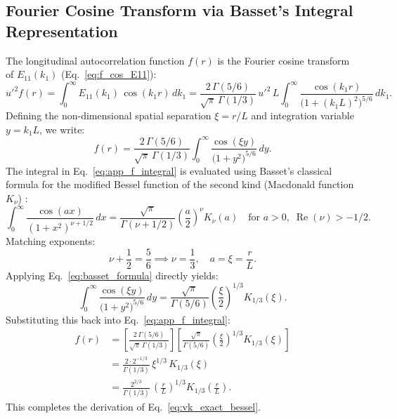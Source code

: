 \documentclass[lineno]{jfm}
\begin{document}
\subsection{Fourier Cosine Transform via Basset's Integral Representation}
The longitudinal autocorrelation function $f(r)$ is the Fourier cosine transform of $E_{11}(k_1)$ (Eq.~\eqref{eq:f_cos_E11}):
\begin{equation}
u'^2 f(r) = \int_0^\infty E_{11}(k_1)\,\cos(k_1 r)\,dk_1 = \frac{2\,\Gamma(5/6)}{\sqrt{\pi}\,\Gamma(1/3)}\,u'^2\,L \int_0^\infty \frac{\cos(k_1 r)}{\big(1 + (k_1 L)^2\big)^{5/6}}\,dk_1.
\end{equation}
Defining the non-dimensional spatial separation $\xi = r/L$ and integration variable $y = k_1 L$, we write:
\begin{equation}
f(r) = \frac{2\,\Gamma(5/6)}{\sqrt{\pi}\,\Gamma(1/3)} \int_0^\infty \frac{\cos(\xi y)}{\big(1 + y^2\big)^{5/6}}\,dy.
\label{eq:app_f_integral}
\end{equation}
The integral in Eq.~\eqref{eq:app_f_integral} is evaluated using Basset's classical formula for the modified Bessel function of the second kind (Macdonald function $K_\nu$) \citep{Basset1888, GradshteynRyzhik}:
\begin{equation}
\int_0^\infty \frac{\cos(a x)}{(1 + x^2)^{\nu + 1/2}}\,dx = \frac{\sqrt{\pi}}{\Gamma(\nu + 1/2)} \left(\frac{a}{2}\right)^\nu K_\nu(a) \quad \text{for } a > 0, \; \operatorname{Re}(\nu) > -1/2.
\label{eq:basset_formula}
\end{equation}
Matching exponents:
\begin{equation}
\nu + \frac{1}{2} = \frac{5}{6} \implies \nu = \frac{1}{3}, \quad a = \xi = \frac{r}{L}.
\end{equation}
Applying Eq.~\eqref{eq:basset_formula} directly yields:
\begin{equation}
\int_0^\infty \frac{\cos(\xi y)}{\big(1 + y^2\big)^{5/6}}\,dy = \frac{\sqrt{\pi}}{\Gamma(5/6)} \left(\frac{\xi}{2}\right)^{1/3} K_{1/3}(\xi).
\end{equation}
Substituting this back into Eq.~\eqref{eq:app_f_integral}:
\begin{align}
\label{eq:app_f_integral_solved}
f(r) &= \left[ \frac{2\,\Gamma(5/6)}{\sqrt{\pi}\,\Gamma(1/3)} \right] \left[ \frac{\sqrt{\pi}}{\Gamma(5/6)} \left(\frac{\xi}{2}\right)^{1/3} K_{1/3}(\xi) \right] \nonumber \\
&= \frac{2 \cdot 2^{-1/3}}{\Gamma(1/3)}\,\xi^{1/3}\,K_{1/3}(\xi) \nonumber \\
&= \frac{2^{2/3}}{\Gamma(1/3)}\,\left(\frac{r}{L}\right)^{1/3} K_{1/3}\left(\frac{r}{L}\right).
\end{align}
This completes the derivation of Eq.~\eqref{eq:vk_exact_bessel}.
\end{document}
